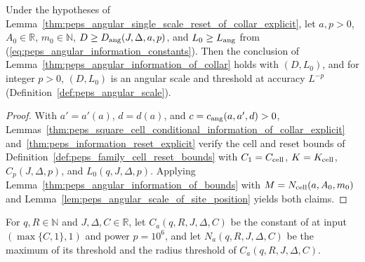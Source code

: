 \begin{lemma}
    \label{thm:peps_angular_information_of_collar_explicit}
    \leanok
    Under the hypotheses of Lemma~\ref{thm:peps_angular_single_scale_reset_of_collar_explicit}, let $a,p>0$, $A_0\in\mathbb R$, $m_0\in\mathbb N$,
    $D\ge D_{\rm ang}(J,\Delta,a,p)$, and $L_0\ge L_{\rm ang}$ from (\ref{eq:peps_angular_information_constants}).
    Then the conclusion of Lemma~\ref{thm:peps_angular_information_of_collar} holds with $(D,L_0)$, and for integer $p>0$, $(D,L_0)$ is an angular scale and threshold at accuracy $L^{-p}$ (Definition~\ref{def:peps_angular_scale}).
\end{lemma}
\begin{proof}\leanok
    With $a'=a'(a)$, $d=d(a)$, and $c=c_{\rm ang}(a,a',d)>0$, Lemmas~\ref{thm:peps_square_cell_conditional_information_of_collar_explicit} and~\ref{thm:peps_information_reset_explicit} verify the cell and reset bounds of Definition~\ref{def:peps_family_cell_reset_bounds} with $C_1=C_{\rm cell}$, $K=K_{\rm cell}$, $C_p(J,\Delta,p)$, and $L_0(q,J,\Delta,p)$. Applying Lemma~\ref{thm:peps_angular_information_of_bounds} with $M=N_{\rm cell}(a,A_0,m_0)$ and Lemma~\ref{lem:peps_angular_scale_of_site_position} yields both claims.
\end{proof}

\begin{definition}
    \label{def:peps_collar_amplification_constants}
    \leanok
    For $q,R\in\mathbb N$ and $J,\Delta,C\in\mathbb R$, let
    $C_a(q,R,J,\Delta,C)$ be the constant of \cite[Proposition~10.2]{OpenAI2026AreaLaw} at input $(\max\{C,1\},1)$ and power $p=10^6$, and let
    $N_a(q,R,J,\Delta,C)$ be the maximum of its threshold and the radius threshold of $C_a(q,R,J,\Delta,C)$.
\end{definition}

